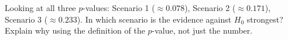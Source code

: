 \documentclass[10pt]{article}
\begin{document}
\begin{reflectionbox}
Looking at all three $p$-values: Scenario 1 ($\approx0.078$), Scenario 2 ($\approx0.171$),
Scenario 3 ($\approx0.233$). In which scenario is the evidence against $H_0$ strongest?
Explain why using the definition of the $p$-value, not just the number.
\end{reflectionbox}
\end{document}
